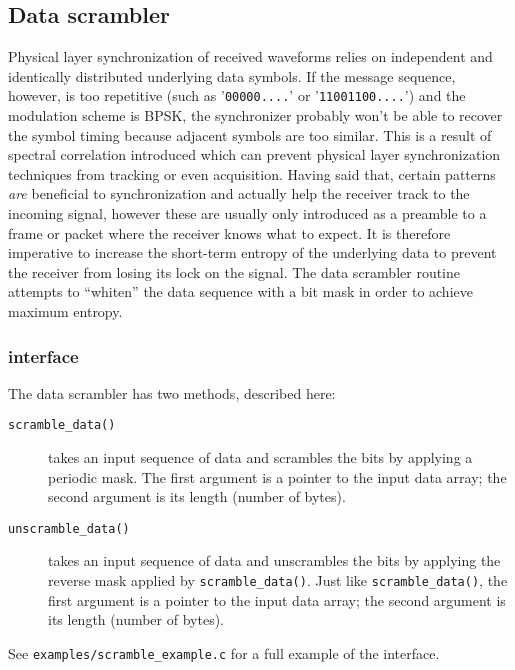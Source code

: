 \subsection{Data scrambler}
\label{module:random:data_scrambler}
Physical layer synchronization of received waveforms relies on independent and
identically distributed underlying data symbols.
If the message sequence, however, is too repetitive
(such as '{\tt 00000....}' or '{\tt 11001100....}')
and the modulation scheme is BPSK, the synchronizer probably won't be able to
recover the symbol timing because adjacent symbols are too similar.
This is a result of spectral correlation introduced which can prevent physical
layer synchronization techniques from tracking or even acquisition.
Having said that, certain patterns {\em are} beneficial to synchronization and
actually help the receiver track to the incoming signal, however these are
usually only introduced as a preamble to a frame or packet where the receiver
knows what to expect.
It is therefore imperative to increase the short-term entropy of the
underlying data to prevent the receiver from losing its lock on the signal.
The data scrambler routine attempts to ``whiten'' the data sequence with a bit
mask in order to achieve maximum entropy.

\subsubsection{interface}
The data scrambler has two methods, described here:
\begin{description}
\item[{\tt scramble\_data()}]
    takes an input sequence of data and scrambles the bits by applying a
    periodic mask.
    The first argument is a pointer to the input data array; the second
    argument is its length (number of bytes).
\item[{\tt unscramble\_data()}]
    takes an input sequence of data and unscrambles the bits by applying the
    reverse mask applied by {\tt scramble\_data()}.
    Just like {\tt scramble\_data()}, the first argument is a pointer to the
    input data array; the second argument is its length (number of bytes).
\end{description}

See {\tt examples/scramble\_example.c} for a full example of the interface.

